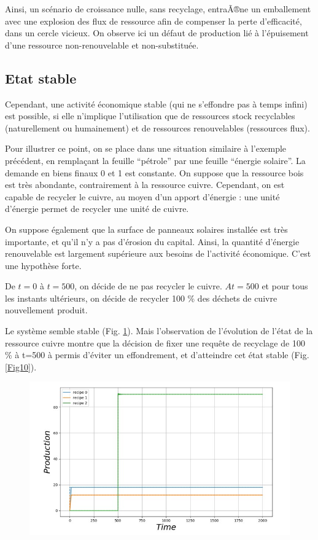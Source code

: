 \documentclass[12pt,a4paper]{article}%
\begin{document}
Ainsi, un scénario de croissance nulle, sans recyclage, entraÃ®ne un
emballement avec une explosion des flux de ressource afin de compenser la
perte d'efficacité, dans un cercle vicieux. On observe ici un défaut de
production lié à l'épuisement d'une ressource non-renouvelable et non-substituée.

\subsection{Etat stable}

Cependant, une activité économique stable (qui ne s'effondre pas à temps
infini) est possible, si elle n'implique l'utilisation que de ressources stock
recyclables (naturellement ou humainement) et de ressources renouvelables
(ressources flux).

Pour illustrer ce point, on se place dans une situation similaire à
l'exemple précédent, en remplaçant la feuille "`pétrole"' par une feuille
"`énergie solaire"'. La demande en biens finaux 0 et 1 est constante. On
suppose que la ressource bois est très abondante, contrairement à la
ressource cuivre. Cependant, on est capable de recycler le cuivre, au moyen
d'un apport d'énergie : une unité d'énergie permet de recycler une unité de cuivre.

On suppose également que la surface de panneaux solaires installée est
très importante, et qu'il n'y a pas d'érosion du capital. Ainsi, la
quantité d'énergie renouvelable est largement supérieure aux besoins de
l'activité économique. C'est une hypothèse forte.

De $t=0$ à $t=500$, on décide de ne pas recycler le cuivre. $At=500$ et
pour tous les instants ultérieurs, on décide de recycler 100 \% des déchets de
cuivre nouvellement produit.

Le système semble stable (Fig. \ref{Fig9}). Mais l'observation de
l'évolution de l'état de la ressource cuivre montre que la décision de fixer
une requête de recyclage de 100 \% à t=500 à permis d'éviter un
effondrement, et d'atteindre cet état stable (Fig. \ref{Fig10}).

\begin{figure}[h]
\centering
\includegraphics[width=1.0\textwidth]{figures/Production9.jpg}\label{Fig9}\end{figure}
\end{document}
